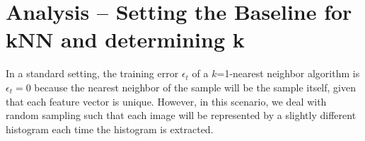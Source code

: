 \section{Analysis -- Setting the Baseline for kNN and determining k}
\label{sec:numtextons}

In a standard setting, the training error $\epsilon_t$ of a
$k$=1-nearest neighbor algorithm is $\epsilon_t = 0$ because the
nearest neighbor of the sample will be the sample itself, given that each feature vector is unique. However, in
this scenario, we deal with random sampling such that each image will
be represented by a slightly different histogram each time the
histogram is extracted.